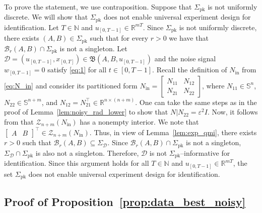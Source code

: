\documentclass[journal,twoside,web]{ieeecolor}
\begin{document}
To prove the statement, we use contraposition. Suppose that $\Sigma_\text{pk}$ is not uniformly discrete. We will show that $\Sigma_\text{pk}$ does not enable universal experiment design for identification. Let $T\in\mathbb{N}$ and \mbox{$u_{[0,T-1]}\in\mathbb{R}^{mT}$}. Since $\Sigma_\text{pk}$ is not uniformly discrete, there exists $(A,B)\in\Sigma_\text{pk}$ such that for every \mbox{$r>0$} we have that $\mathcal{B}_r(A,B)\cap\Sigma_\text{pk}$ is not a singleton. Let \mbox{$\mathcal{D}=(u_{[0,T-1]},x_{[0,T]})\in\mathfrak{B}(A,B,u_{[0,T-1]})$} and the noise signal $w_{[0,T-1]}=0$ satisfy \eqref{eq:1} for all $t\in[0,T-1]$. Recall the definition of $N_\text{in}$ from \eqref{eq:N_in} and consider its partitioned form $N_\text{in}=\begin{bmatrix}
N_{11} & N_{12} \\
N_{21} & N_{22}
\end{bmatrix}$, where $N_{11}\in\mathbb{S}^n$, \mbox{$N_{22}\in\mathbb{S}^{n+m}$}, and \mbox{$N_{12}=N_{21}^\top\in\mathbb{R}^{n\times (n+m)}$}. One can take the same steps as in the proof of Lemma~\ref{lem:noisy_rad_lower} to show that $N|N_{22}=\varepsilon^2 I$. Now, it follows from \cite[Thm. 3.2(c)]{HenkQMI2023} that $\mathcal{Z}_{n+m}(N_\text{in})$ has a nonempty interior. We note that \mbox{$\begin{bmatrix}
A & B
\end{bmatrix}^\top\in\mathcal{Z}_{n+m}(N_\text{in})$}. Thus, in view of Lemma~\ref{lem:exp_qmi}, there exists $r>0$ such that $\mathcal{B}_r(A,B)\subseteq\Sigma_\mathcal{D}$. Since $\mathcal{B}_r(A,B)\cap\Sigma_\text{pk}$ is not a singleton, $\Sigma_\mathcal{D}\cap\Sigma_\text{pk}$ is also not a singleton. Therefore, $\mathcal{D}$ is not $\Sigma_\text{pk}$--informative for identification. Since this argument holds for all $T\in\mathbb{N}$ and $u_{[0,T-1]}\in\mathbb{R}^{mT}$, the set $\Sigma_\text{pk}$ does not enable universal experiment design for identification. \hfill \QED

\subsection{Proof of Proposition~\ref{prop:data_best_noisy}}
\end{document}
